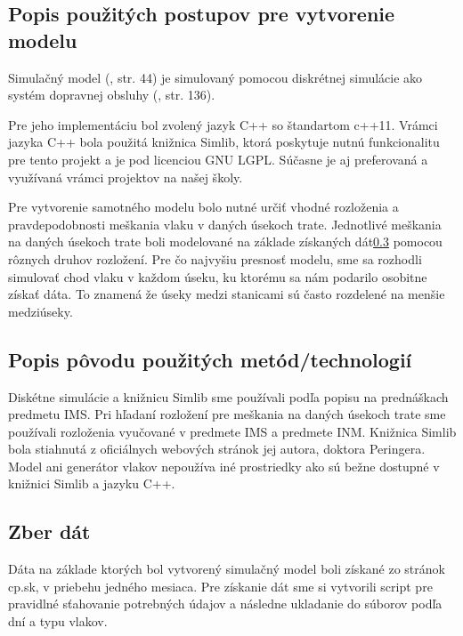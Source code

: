 \documentclass[11pt,a4paper]{article}
\begin{document}
\subsection{Popis použitých postupov pre vytvorenie modelu}
\label{sec:POSTUPI}

Simulačný model (\cite{odkaz:simulacia}, str. 44) je simulovaný pomocou diskrétnej simulácie ako systém dopravnej obsluhy (\cite{odkaz:simulacia}, str. 136).

Pre jeho implementáciu bol zvolený jazyk C++ so štandartom c++11.
Vrámci jazyka C++ bola použitá knižnica Simlib\cite{odkaz:simlib}, ktorá poskytuje nutnú funkcionalitu pre tento projekt a je pod licenciou GNU LGPL.
Súčasne je aj preferovaná a využívaná vrámci projektov na našej školy.

Pre vytvorenie samotného modelu bolo nutné určiť vhodné rozloženia a pravdepodobnosti meškania vlaku v daných úsekoch trate.
Jednotlivé meškania na daných úsekoch trate boli modelované na základe získaných dát\ref{sec:DATA} pomocou rôznych druhov rozložení.
Pre čo najvyšiu presnosť modelu, sme sa rozhodli simulovať chod vlaku v každom úseku, ku ktorému sa nám podarilo osobitne získať dáta.
To znamená že úseky medzi stanicami sú často rozdelené na menšie medziúseky.

\subsection{Popis pôvodu použitých metód/technologií}
\label{sec:POPISTECHNOLOGII}

Diskétne simulácie a knižnicu Simlib sme používali podľa popisu na prednáškach predmetu IMS.
Pri hľadaní rozložení pre meškania na daných úsekoch trate sme používali rozloženia vyučované v predmete IMS a predmete INM.
Knižnica Simlib bola stiahnutá z oficiálnych webových stránok jej autora, doktora Peringera\cite{odkaz:simlib}.
Model ani generátor vlakov nepoužíva iné prostriedky ako sú bežne dostupné v knižnici Simlib a jazyku C++.

\subsection{Zber dát}
\label{sec:DATA}

Dáta na základe ktorých bol vytvorený simulačný model boli získané zo stránok cp.sk\cite{odkaz:cpsk}, v priebehu jedného mesiaca.
Pre získanie dát sme si vytvorili script pre pravidlné sťahovanie potrebných údajov a následne ukladanie do súborov podľa dní a typu vlakov.\cite{odkaz:cpskapi}
\end{document}
